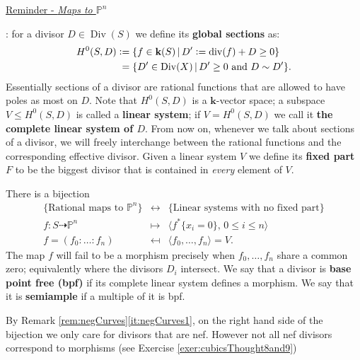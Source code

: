 \documentclass[a4paper,11pt]{amsart}
\def\Div{\operatorname{Div}}
\def\divv{\operatorname{div}}
\newcommand{\PP}{\mathbb{P}}
\newcommand{\kk}{\textbf{k}}
\newcommand{\defeq}{\vcentcolon=}
\newcommand{\rmap}{\dashrightarrow}
\begin{document}
\begin{minipage}{.8\textwidth}
\hypertarget{rem:maps}{\underline{Reminder - \emph{Maps to $\PP^n$}}}:
for a divisor $D \in \Div(S)$ we define its \textbf{global sections} as:
\begin{align*}
	H^0(S,D) &\defeq \{ f \in \kk(S) \,|\, D'\defeq \divv(f) + D \geq 0 \} \\
	& \phantom{:}= \{D' \in \Div(X) \, | \, D' \geq 0 \text{ and } D \sim D'\}.
\end{align*}
Essentially sections of a divisor are rational functions that are allowed to have poles as most on $D$.
Note that $H^0(S,D)$ is a $\kk$-vector space;
a subspace $V \leq H^0(S,D)$ is called a \textbf{linear system};
if $V = H^0(S,D)$ we call it \textbf{the complete linear system of $D$}.
From now on, whenever we talk about sections of a divisor, we will freely interchange between the rational functions and the corresponding effective divisor.
Given a linear system $V$ we define its \textbf{fixed part} $F$ to be the biggest divisor that is contained in \emph{every} element of $V$.

\vspace{.1cm}

There is a bijection 
\[
\begin{array}{ccc}
	\big\{ \text{Rational maps to $\PP^n$} \big\} & \leftrightarrow & \big\{ \text{Linear systems with no fixed part} \}\\
	f\colon S \rmap \PP^n & \mapsto & \langle f^*\{x_i =0\}, \, 0\leq i \leq n \rangle \\
	f =  (f_0:\ldots :f_n) & \mapsfrom & \langle f_0,\dots, f_n \rangle = V.
\end{array}
\]
The map $f$ will fail to be a morphism precisely when $f_0, \dots, f_n$ share a common zero;
equivalently where the divisors $D_i$ intersect.
We say that a divisor is \textbf{base point free (bpf)} if its complete linear system defines a morphism.
We say that it is \textbf{semiample} if a multiple of it is bpf.

By Remark \ref{rem:negCurves}\eqref{it:negCurves1}, on the right hand side of the bijection we only care for divisors that are nef.
However not all nef divisors correspond to morphisms (see Exercise \ref{exer:cubicsThought8and9})
\end{minipage}
\end{document}
